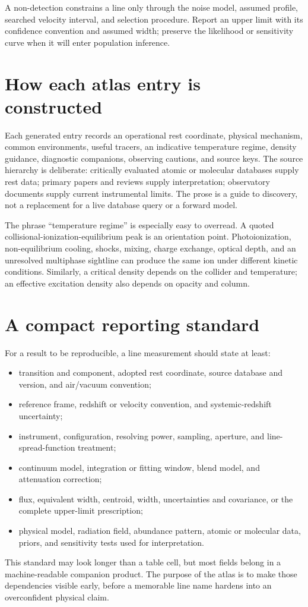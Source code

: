 \begin{cautionbox}
A non-detection constrains a line only through the noise model, assumed profile,
searched velocity interval, and selection procedure.  Report an upper limit with
its confidence convention and assumed width; preserve the likelihood or sensitivity
curve when it will enter population inference.
\end{cautionbox}

\section{How each atlas entry is constructed}

Each generated entry records an operational rest coordinate, physical mechanism,
common environments, useful tracers, an indicative temperature regime, density
guidance, diagnostic companions, observing cautions, and source keys.  The source
hierarchy is deliberate: critically evaluated atomic or molecular databases supply
rest data; primary papers and reviews supply interpretation; observatory documents
supply current instrumental limits.  The prose is a guide to discovery, not a
replacement for a live database query or a forward model.

The phrase ``temperature regime'' is especially easy to overread.  A quoted
collisional-ionization-equilibrium peak is an orientation point.  Photoionization,
non-equilibrium cooling, shocks, mixing, charge exchange, optical depth, and an
unresolved multiphase sightline can produce the same ion under different kinetic
conditions.  Similarly, a critical density depends on the collider and temperature;
an effective excitation density also depends on opacity and column.

\section{A compact reporting standard}

For a result to be reproducible, a line measurement should state at least:
\begin{itemize}
  \item transition and component, adopted rest coordinate, source database and
        version, and air/vacuum convention;
  \item reference frame, redshift or velocity convention, and systemic-redshift
        uncertainty;
  \item instrument, configuration, resolving power, sampling, aperture, and
        line-spread-function treatment;
  \item continuum model, integration or fitting window, blend model, and
        attenuation correction;
  \item flux, equivalent width, centroid, width, uncertainties and covariance, or
        the complete upper-limit prescription;
  \item physical model, radiation field, abundance pattern, atomic or molecular
        data, priors, and sensitivity tests used for interpretation.
\end{itemize}

This standard may look longer than a table cell, but most fields belong in a
machine-readable companion product.  The purpose of the atlas is to make those
dependencies visible early, before a memorable line name hardens into an
overconfident physical claim.
